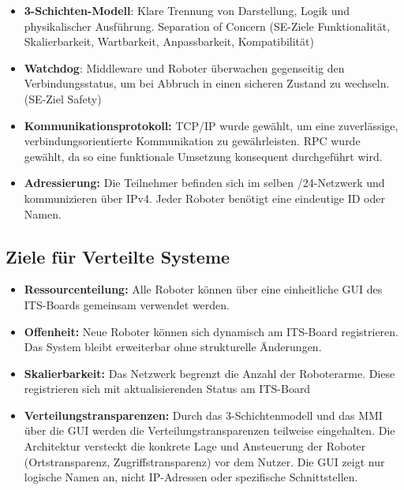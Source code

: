 \begin{itemize}
	\item \textbf{3-Schichten-Modell}: Klare Trennung von Darstellung, Logik und physikalischer Ausführung. Separation of Concern (SE-Ziele Funktionalität, Skalierbarkeit, Wartbarkeit, Anpassbarkeit, Kompatibilität)
	\item \textbf{Watchdog}: Middleware und Roboter überwachen gegenseitig den Verbindungsstatus, um bei Abbruch in einen sicheren Zustand zu wechseln. (SE-Ziel Safety)
	\item \textbf{Kommunikationsprotokoll:} TCP/IP wurde gewählt, um eine zuverlässige, verbindungsorientierte Kommunikation zu gewährleisten. RPC wurde gewählt, da so eine funktionale Umsetzung konsequent durchgeführt wird.
	\item \textbf{Adressierung:} Die Teilnehmer befinden sich im selben /24-Netzwerk und kommunizieren über IPv4. Jeder Roboter benötigt eine eindeutige ID oder Namen.
\end{itemize}

\subsection*{Ziele für Verteilte Systeme}
\begin{itemize}
	\item \textbf{Ressourcenteilung:} Alle Roboter können über eine einheitliche GUI des ITS-Boards gemeinsam verwendet werden.
	\item \textbf{Offenheit:} Neue Roboter können sich dynamisch am ITS-Board registrieren. Das System bleibt erweiterbar ohne strukturelle Änderungen.
	\item \textbf{Skalierbarkeit:} Das Netzwerk begrenzt die Anzahl der Roboterarme. Diese registrieren sich mit aktualisierenden Status am ITS-Board
	\item \textbf{Verteilungstransparenzen:} Durch das 3-Schichtenmodell und das MMI über die GUI werden die Verteilungstransparenzen teilweise eingehalten. Die Architektur versteckt die konkrete Lage und Ansteuerung der Roboter (Ortstransparenz, Zugriffstransparenz) vor dem Nutzer. Die GUI zeigt nur logische Namen an, nicht IP-Adressen oder spezifische Schnittstellen.
\end{itemize}


